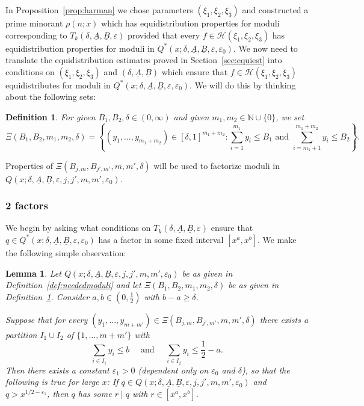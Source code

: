 \documentclass{amsart}
\newtheorem{lemma}{Lemma}
\newtheorem{defn}{Definition}
\numberwithin{equation}{section}
\begin{document}
In Proposition~\ref{prop:harman} we chose parameters $(\xi_1, \xi_2,\xi_3)$ and constructed a prime minorant $\rho(n;x)$ which has  equidistribution properties for  moduli corresponding to $T_k(\delta,\underline{A},\underline{B},\varepsilon)$ provided that every $f \in \mathcal{H}(\xi_1, \xi_2,\xi_3)$  has equidistribution properties for moduli in $Q^*(x;\delta,\underline{A},\underline{B},\varepsilon,\varepsilon_0)$. We now need to translate the equidistribution estimates proved in Section~\ref{sec:equiest} into conditions on  $(\xi_1, \xi_2,\xi_3)$  and $(\delta, \underline{A}, \underline{B})$ which ensure that $f \in \mathcal{H}(\xi_1, \xi_2,\xi_3)$ equidistributes for moduli in $Q^*(x;\delta,\underline{A},\underline{B},\varepsilon,\varepsilon_0)$. We will do this by thinking  about the following sets:


\begin{defn}\label{def:checkset} For given $B_1, B_2, \delta \in (0,\infty)$ and given $m_1, m_2 \in \mathbb{N}\cup\{0\}$, we set 
$$\Xi(B_1,B_2,m_1,m_2,\delta)=\left\{(y_1, \dots, y_{m_1+m_2}) \in [\delta,1]^{m_1+m_2}: \sum_{i=1}^{m_1} y_i \leq  B_{1}  \mbox{ and }   \sum_{i=m_1+1}^{m_1+m_2} y_i \leq B_{2} \right\}.$$ 
\end{defn}
Properties of $\Xi(B_{j,m},B_{j',m'},m,m',\delta)$ will be used to factorize moduli in $Q(x;\delta,\underline{A},\underline{B},\varepsilon,j,j',m,m',\varepsilon_0)$.

\subsubsection{2 factors}

\medskip We begin by asking what conditions on $T_k(\delta,\underline{A},\underline{B},\varepsilon)$ ensure that   $q \in Q^*(x;\delta,\underline{A},\underline{B},\varepsilon,\varepsilon_0)$ has a factor in some fixed interval $[x^a, x^b]$. 
We make the following simple observation:
\begin{lemma}\label{lem:partition1} Let $Q(x;\delta,\underline{A},\underline{B},\varepsilon,j,j',m,m',\varepsilon_0)$ be as given in Definition~\ref{def:neededmoduli} and let $\Xi(B_1,B_2,m_1,m_2,\delta)$ be as given in Definition~\ref{def:checkset}. 
 Consider $a, b \in (0,\frac{1}{2})$   with $b-a \geq \delta$.
 
 
 \smallskip 
  Suppose that for every  $(y_1, \dots, y_{m+m'}) \in \Xi(B_{j,m},B_{j',m'},m,m',\delta)$  there exists a partition $I_1 \cup I_2$ of $\{1, \dots, m+m'\}$ with 
$$ \sum_{i \in I_1} y_i \leq b \quad \mbox{ and } \quad  \sum_{i \in I_2} y_i \leq  \frac{1}{2}-a. $$
Then there exists a constant $\varepsilon_1>0$ (dependent only on $\varepsilon_0$ and $\delta$), so that the following is true for large $x$:  If $q \in Q(x;\delta,\underline{A},\underline{B},\varepsilon,j,j',m,m',\varepsilon_0)$ and $q > x^{1/2-\varepsilon_1}$, then $q$ has some $r \mid q$ with $r \in  [x^{a}, x^b]$. 
\end{lemma} 
\end{document}
